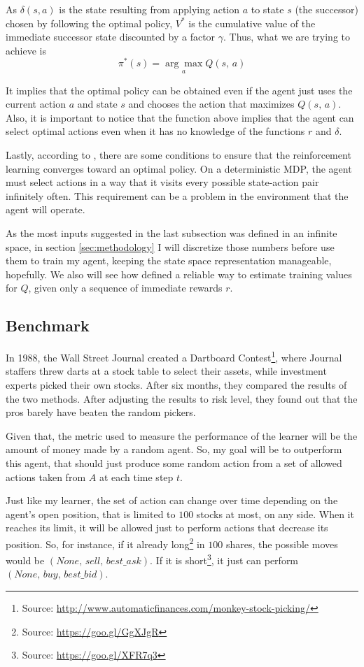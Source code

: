 \documentclass[a4paper]{article}
\begin{document}
As $\delta(s, a)$ is the state resulting from applying action $a$ to state $s$ (the successor) chosen by following the optimal policy, $V^{*}$ is the cumulative value of the immediate successor state discounted by a factor $\gamma$. Thus,  what we are trying to achieve is
$$\pi^{*}(s) = \underset{a}{\arg \max} Q(s, \, a)$$

It implies that the optimal policy can be obtained even if the agent just uses the current action $a$ and state $s$ and chooses the action that maximizes $Q(s,\, a)$. Also, it is important to notice that the function above implies that the agent can select optimal actions even when it has no knowledge of the functions $r$ and $\delta$.

Lastly, according to \cite{Mitchell}, there are some conditions to ensure that the reinforcement learning converges toward an optimal policy. On a deterministic MDP, the agent must select actions in a way that it visits every possible state-action pair infinitely often. This requirement can be a problem in the environment that the agent will operate.

As the most inputs suggested in the last subsection was defined in an infinite space, in section \ref{sec:methodology} I will discretize those numbers before use them to train my agent, keeping the state space representation manageable, hopefully. We also will see how \cite{Mitchell} defined a reliable way to estimate training values for $Q$, given only a sequence of immediate rewards $r$.

\subsection{Benchmark}
In 1988, the Wall Street Journal created a Dartboard Contest\footnote{Source: \url{http://www.automaticfinances.com/monkey-stock-picking/}}, where Journal staffers threw darts at a stock table to select their assets, while investment experts picked their own stocks. After six months, they compared the results of the two methods. After adjusting the results to risk level, they found out that the pros barely have beaten the random pickers.

Given that, the metric used to measure the performance of the learner will be the amount of money made by a random agent. So, my goal will be to outperform this agent, that should just produce some random action from a set of allowed actions taken from $A$ at each time step $t$.

Just like my learner, the set of action can change over time depending on the agent's open position, that is limited to $100$ stocks at most, on any side. When it reaches its limit, it will be allowed just to perform actions that decrease its position. So, for instance, if it already long\footnote{Source: \url{https://goo.gl/GgXJgR}} in $100$ shares, the possible moves would be $\left (None,\, sell,\, best\_ask \right)$. If it is short\footnote{Source: \url{https://goo.gl/XFR7q3}}, it just can perform $\left (None,\, buy,\, best\_bid\right)$.
\end{document}
